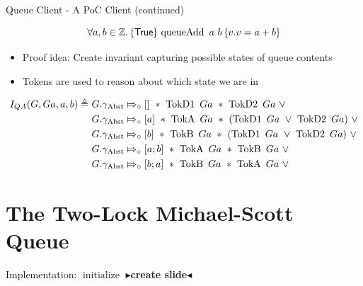 \documentclass[9pt]{beamer}
\newcommand{\initialise}{\operatorname{initialize}}
\newcommand{\queueAdd}{\operatorname{queueAdd}}
\newcommand{\QueueAddInvariant}{I_{QA}}
\newcommand{\Qg}{G}
\newcommand{\QAg}{Ga}
\newcommand{\gabst}{\gname_{\mathrm{Abst}}}
\newcommand{\TokDo}[1]{\operatorname{TokD1} ~ #1}
\newcommand{\TokDoQAg}{\TokDo{\QAg}}
\newcommand{\TokDt}[1]{\operatorname{TokD2} ~ #1}
\newcommand{\TokDtQAg}{\TokDt{\QAg}}
\newcommand{\TokA}[1]{\operatorname{TokA} ~ #1}
\newcommand{\TokAQAg}{\TokA{\QAg}}
\newcommand{\TokB}[1]{\operatorname{TokB} ~ #1}
\newcommand{\TokBQAg}{\TokB{\QAg}}
\newcommand{\abstractstatefullfrag}[2]{#1 \Mapsto_{\circ} #2}
\newcommand{\todo}[1]{{\color[rgb]{.5,0,0}\textbf{$\blacktriangleright$#1$\blacktriangleleft$}}}
\begin{document}
\begin{frame}[containsverbatim]{Queue Client - A PoC Client (continued)}
  
  \begin{lemma}\label{QueueSpecs:spec:queueadd}
    \begin{equation*}
      \All a, b \in \mathbb{Z} . \hoare{\TRUE}{\queueAdd \ a \ b}{v . v = a + b}
    \end{equation*}
  \end{lemma}

  \begin{itemize}
    \item Proof idea: Create invariant capturing possible states of queue contents
    \item Tokens are used to reason about which state we are in
  \end{itemize}
  
  \begin{definition}\label{QueueSpecs:queueadd:invariant}
    \begin{align*}
      \QueueAddInvariant(\Qg, \QAg, a, b) \eqdef~
      &\abstractstatefullfrag{\Qg.\gabst}{[]}~\star~\TokDoQAg~\star~\TokDtQAg~\lor\\
      &\abstractstatefullfrag{\Qg.\gabst}{[a]}~\star~\TokAQAg~\star~(\TokDoQAg~\lor~\TokDtQAg)~\lor\\
      &\abstractstatefullfrag{\Qg.\gabst}{[b]}~\star~\TokBQAg~\star~(\TokDoQAg~\lor~\TokDtQAg)~\lor\\
      &\abstractstatefullfrag{\Qg.\gabst}{[a; b]}~\star~\TokAQAg~\star~\TokBQAg~\lor\\
      &\abstractstatefullfrag{\Qg.\gabst}{[b; a]}~\star~\TokBQAg~\star~\TokAQAg~\lor
    \end{align*}
  \end{definition}
\end{frame}


\section{The Two-Lock Michael-Scott Queue}

\begin{frame}{Implementation: $\initialise$}
  \todo{create slide}
\end{frame}
\end{document}
